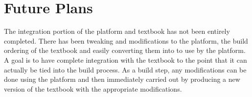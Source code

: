 \section{Future Plans}

The integration portion of the platform and textbook has not been entirely completed. There has been tweaking and modifications to the platform, the build ordering of the textbook and easily converting them into to use by the platform. A goal is to have complete integration with the textbook to the point that it can actually be tied into the build process. As a build step, any modifications can be done using the platform and then immediately carried out by producing a new version of the textbook with the appropriate modifications.
